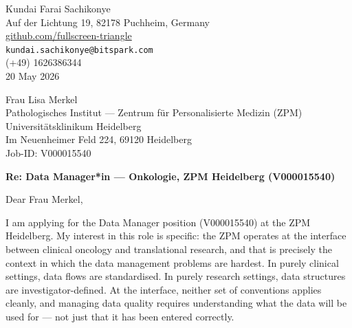 \documentclass[12pt,a4paper]{article}
\begin{document}
\begin{flushright}
Kundai Farai Sachikonye \\
Auf der Lichtung 19, 82178 Puchheim, Germany \\
\href{https://github.com/fullscreen-triangle}{github.com/fullscreen-triangle} \\
\texttt{kundai.sachikonye@bitspark.com} \\
(+49) 1626386344 \\[6pt]
20 May 2026
\end{flushright}

\vspace{1em}

Frau Lisa Merkel \\
Pathologisches Institut --- Zentrum für Personalisierte Medizin (ZPM) \\
Universitätsklinikum Heidelberg \\
Im Neuenheimer Feld 224, 69120 Heidelberg \\
Job-ID: V000015540

\vspace{1.5em}

\textbf{Re: Data Manager*in --- Onkologie, ZPM Heidelberg (V000015540)}

\vspace{1em}

Dear Frau Merkel,

I am applying for the Data Manager position (V000015540) at the ZPM Heidelberg.
My interest in this role is specific: the ZPM operates at the interface between
clinical oncology and translational research, and that is precisely the context
in which the data management problems are hardest.
In purely clinical settings, data flows are standardised.
In purely research settings, data structures are investigator-defined.
At the interface, neither set of conventions applies cleanly, and managing
data quality requires understanding what the data will be used for --- not just
that it has been entered correctly.
\end{document}
